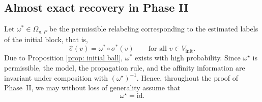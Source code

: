 \documentclass[11pt, a4paper]{amsart}
\newcommand{\1}{\mathbf{1}}
\theoremstyle{definition}
\theoremstyle{remark}
\theoremstyle{definition}
\begin{document}
\subsection{Almost exact recovery in Phase II}


Let $\omega^* \in \Omega_{\pi,P}$ be the permissible relabeling corresponding to the
estimated labels of the initial block, that is,
\[
\hat{\sigma}(v)=\omega^* \circ \sigma^*(v)
\qquad \text{for all } v\in V_{\mathrm{init}}.
\]
Due to Proposition \ref{prop: initial ball}, $\omega^*$ exists with high probability. Since $\omega^\star$ is permissible, the model, the propagation rule,
and the affinity information are invariant under composition with
$(\omega^\star)^{-1}$. Hence, throughout the proof of Phase~II, we may
without loss of generality assume that
\[
\omega^\star=\mathrm{id}.
\]
\end{document}
